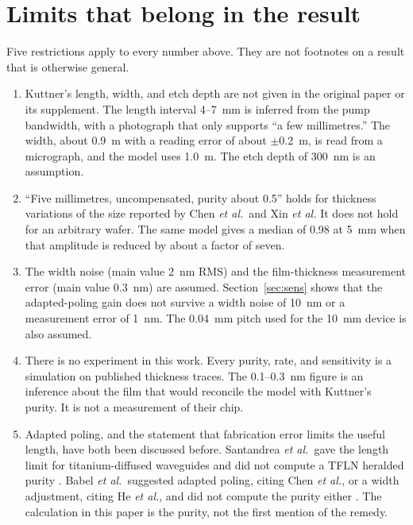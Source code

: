 \documentclass[11pt,a4paper]{article}
\begin{document}
\section{Limits that belong in the result}
\label{sec:limits}
Five restrictions apply to every number above.
They are not footnotes on a result that is otherwise general.

\begin{enumerate}
\item Kuttner's length, width, and etch depth are not given in the original paper or its supplement.
The length interval 4--7~mm is inferred from the pump bandwidth, with a photograph that only supports ``a few millimetres.''
The width, about 0.9~\textmu m with a reading error of about $\pm 0.2$~\textmu m, is read from a micrograph, and the model uses 1.0~\textmu m.
The etch depth of 300~nm is an assumption.
\item ``Five millimetres, uncompensated, purity about 0.5'' holds for thickness variations of the size reported by Chen \emph{et al.}\ and Xin \emph{et al.}
It does not hold for an arbitrary wafer.
The same model gives a median of 0.98 at 5~mm when that amplitude is reduced by about a factor of seven.
\item The width noise (main value 2~nm RMS) and the film-thickness measurement error (main value 0.3~nm) are assumed.
Section~\ref{sec:sens} shows that the adapted-poling gain does not survive a width noise of 10~nm or a measurement error of 1~nm.
The 0.04~mm pitch used for the 10~mm device is also assumed.
\item There is no experiment in this work.
Every purity, rate, and sensitivity is a simulation on published thickness traces.
The 0.1--0.3~nm figure is an inference about the film that would reconcile the model with Kuttner's purity.
It is not a measurement of their chip.
\item Adapted poling, and the statement that fabrication error limits the useful length, have both been discussed before.
Santandrea \emph{et al.}\ gave the length limit for titanium-diffused waveguides and did not compute a TFLN heralded purity \cite{Santandrea2019}.
Babel \emph{et al.}\ suggested adapted poling, citing Chen \emph{et al.}, or a width adjustment, citing He \emph{et al.}, and did not compute the purity either \cite{Babel2025,He2024}.
The calculation in this paper is the purity, not the first mention of the remedy.
\end{enumerate}
\end{document}
